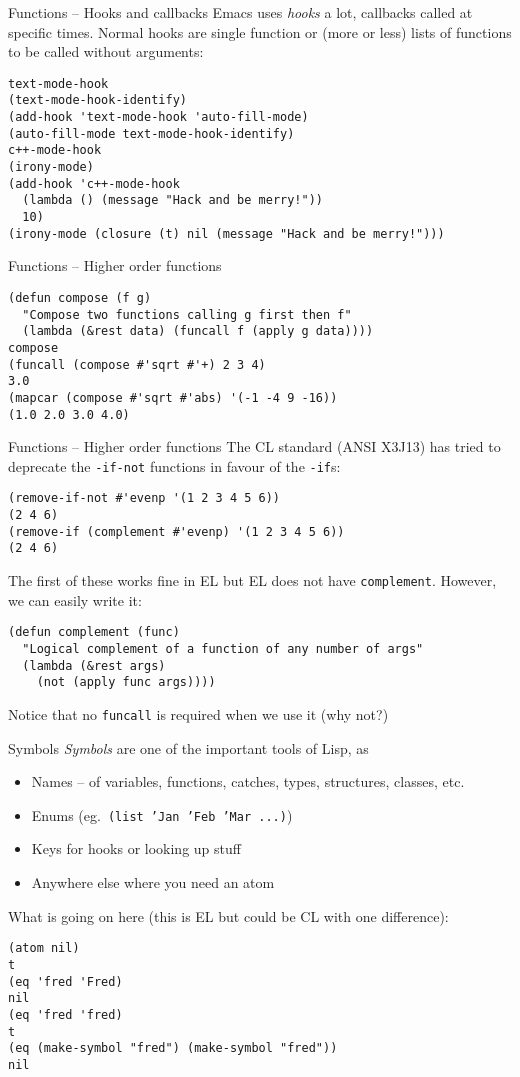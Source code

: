 \documentclass[presentation]{beamer}
\begin{document}
\begin{frame}[fragile]{Functions -- Hooks and callbacks}
Emacs uses \emph{hooks} a lot, callbacks called at specific times.  Normal hooks are single function or (more or less) lists of functions to be called without arguments:
\begin{verbatim}
text-mode-hook
(text-mode-hook-identify)
(add-hook 'text-mode-hook 'auto-fill-mode)
(auto-fill-mode text-mode-hook-identify)
c++-mode-hook
(irony-mode)
(add-hook 'c++-mode-hook
  (lambda () (message "Hack and be merry!"))
  10)
(irony-mode (closure (t) nil (message "Hack and be merry!")))
\end{verbatim}
\end{frame}

\begin{frame}[fragile]{Functions -- Higher order functions}
\begin{verbatim}
(defun compose (f g)
  "Compose two functions calling g first then f"
  (lambda (&rest data) (funcall f (apply g data))))
compose
(funcall (compose #'sqrt #'+) 2 3 4)
3.0
(mapcar (compose #'sqrt #'abs) '(-1 -4 9 -16))
(1.0 2.0 3.0 4.0)
\end{verbatim}
\end{frame}

\begin{frame}[fragile]{Functions -- Higher order functions}
The CL standard (ANSI X3J13) has tried to deprecate the \texttt{-if-not} functions in favour of the \texttt{-if}s:
\begin{verbatim}
(remove-if-not #'evenp '(1 2 3 4 5 6))
(2 4 6)
(remove-if (complement #'evenp) '(1 2 3 4 5 6))
(2 4 6)
\end{verbatim}
The first of these works fine in EL but EL does not have \texttt{complement}.  However, we can easily write it:
\begin{verbatim}
(defun complement (func)
  "Logical complement of a function of any number of args"
  (lambda (&rest args)
    (not (apply func args))))
\end{verbatim}
Notice that no \texttt{funcall} is required when we use it (why not?)
\end{frame}

\begin{frame}[fragile]{Symbols}
  \emph{Symbols} are one of the important tools of Lisp, as
  \begin{itemize}
  \item Names -- of variables, functions, catches, types, structures, classes, etc.
  \item Enums (eg.\ \texttt{(list 'Jan 'Feb 'Mar ...)})
  \item Keys for hooks or looking up stuff
  \item Anywhere else where you need an atom
  \end{itemize}

What is going on here (this is EL but could be CL with one difference):
\begin{verbatim}
(atom nil)
t
(eq 'fred 'Fred)
nil
(eq 'fred 'fred)
t
(eq (make-symbol "fred") (make-symbol "fred"))
nil
\end{verbatim}

\end{frame}
\end{document}
